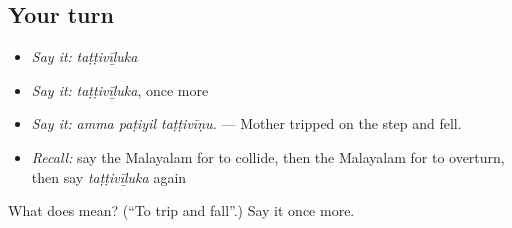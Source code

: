 \subsection*{Your turn}
\begin{itemize}
\raggedright
  \item \emph{Say it:} \emph{taṭṭivīḻuka}
  \item \emph{Say it:} \emph{taṭṭivīḻuka}, once more
  \item \emph{Say it:} \emph{amma paṭiyil taṭṭivīṇu.} — Mother tripped on the step and fell.
  \item \emph{Recall:} say the Malayalam for to collide, then the Malayalam for to overturn, then say \emph{taṭṭivīḻuka} again
\end{itemize}

\begin{tcolorbox}[breakable,colback=teal!4,colframe=teal!35!black,title={Before you move on}]
What does  mean? (\textquotedblleft{}To trip and fall\textquotedblright{}.) Say it once more.
\end{tcolorbox}

